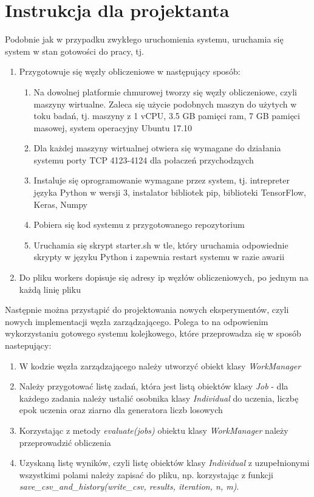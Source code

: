 \chapter[Dodatek D]{Instrukcja dla projektanta}
Podobnie jak w przypadku zwykłego uruchomienia systemu, uruchamia się system w stan gotowości do pracy, tj.
\begin{enumerate}
  \item Przygotowuje się węzły obliczeniowe w następujący sposób:
  \begin{enumerate}
    \item Na dowolnej platformie chmurowej tworzy się węzły obliczeniowe, czyli maszyny wirtualne.
    Zaleca się użycie podobnych maszyn do użytych w toku badań, tj. maszyny z 1 vCPU, 3.5 GB pamięci ram, 7 GB pamięci masowej, system operacyjny Ubuntu 17.10
    \item Dla każdej maszyny wirtualnej otwiera się wymagane do działania systemu porty TCP 4123-4124 dla połaczeń przychodząych
    \item Instaluje się oprogramowanie wymagane przez system, tj. intrepreter języka Python w wersji 3, instalator bibliotek pip, biblioteki TensorFlow, Keras, Numpy
    \item Pobiera się kod systemu z przygotowanego repozytorium
    \item Uruchamia się skrypt starter.sh w tle, który uruchamia odpowiednie skrypty w języku Python i zapewnia restart systemu w razie awarii
  \end{enumerate}
  \item Do pliku workers dopisuje się adresy ip węzłów obliczeniowych, po jednym na każdą linię pliku
\end{enumerate}

Następnie można przystąpić do projektowania nowych eksperymentów, czyli nowych implementacji węzła zarządzającego.
Polega to na odpowienim wykorzystaniu gotowego systemu kolejkowego, które przeprowadza się w sposób nastepujący:
\begin{enumerate}
  \item W kodzie węzła zarządzającego należy utworzyć obiekt klasy \textit{WorkManager}
  \item Należy przygotować listę zadań, która jest listą obiektów klasy \textit{Job} - dla każdego zadania należy ustalić osobnika klasy \textit{Individual} do uczenia, liczbę epok uczenia oraz ziarno dla generatora liczb losowych
  \item Korzystając z metody \textit{evaluate(jobs)} obiektu klasy \textit{WorkManager} należy przeprowadzić obliczenia
  \item Uzyskaną listę wyników, czyli listę obiektów klasy \textit{Individual} z uzupełnionymi wszystkimi polami należy zapisać do pliku, np. korzystając z funkcji \textit{save\_csv\_and\_history(write\_csv, results, iteration, n, m)}.
\end{enumerate}

